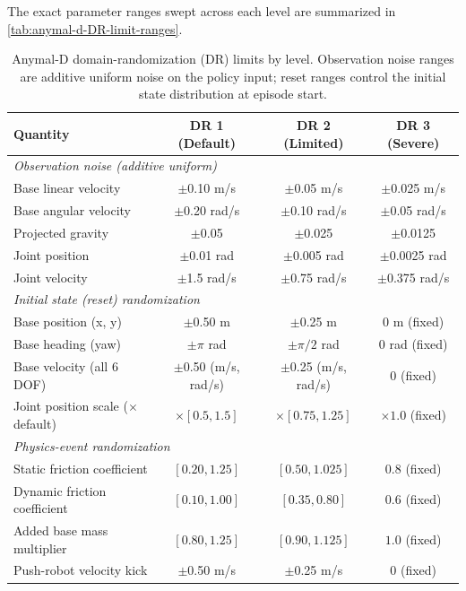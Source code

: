 \documentclass{article} %
\begin{document}
        The exact parameter ranges swept across each level are summarized in \autoref{tab:anymal-d-DR-limit-ranges}.
    
        \begin{table}[ht]
        \centering
        \caption{Anymal-D domain-randomization (DR) limits by level. Observation noise ranges are additive uniform noise on the policy input; reset ranges control the initial state distribution at episode start.}
        \label{tab:anymal-d-DR-limit-ranges}
        \begin{tabular}{lccc}
        \toprule
        Quantity & DR 1 (Default) & DR 2 (Limited) & DR 3 (Severe) \\
        \midrule
        \multicolumn{4}{l}{\textit{Observation noise (additive uniform)}} \\
        Base linear velocity & $\pm$0.10 m/s & $\pm$0.05 m/s & $\pm$0.025 m/s \\
        Base angular velocity & $\pm$0.20 rad/s & $\pm$0.10 rad/s & $\pm$0.05 rad/s \\
        Projected gravity & $\pm$0.05 & $\pm$0.025 & $\pm$0.0125 \\
        Joint position & $\pm$0.01 rad & $\pm$0.005 rad & $\pm$0.0025 rad \\
        Joint velocity & $\pm$1.5 rad/s & $\pm$0.75 rad/s & $\pm$0.375 rad/s \\
        \midrule
        \multicolumn{4}{l}{\textit{Initial state (reset) randomization}} \\
        Base position (x, y) & $\pm$0.50 m & $\pm$0.25 m & 0 m (fixed) \\
        Base heading (yaw) & $\pm\pi$ rad & $\pm\pi/2$ rad & 0 rad (fixed) \\
        Base velocity (all 6 DOF) & $\pm$0.50 (m/s, rad/s) & $\pm$0.25 (m/s, rad/s) & 0 (fixed) \\
        Joint position scale ($\times$ default) & $\times[0.5, 1.5]$ & $\times[0.75, 1.25]$ & $\times1.0$ (fixed) \\
        \midrule
        \multicolumn{4}{l}{\textit{Physics-event randomization}} \\
        Static friction coefficient & $[0.20, 1.25]$ & $[0.50, 1.025]$ & $0.8$ (fixed) \\
        Dynamic friction coefficient & $[0.10, 1.00]$ & $[0.35, 0.80]$ & $0.6$ (fixed) \\
        Added base mass multiplier & $[0.80, 1.25]$ & $[0.90, 1.125]$ & $1.0$ (fixed) \\
        Push-robot velocity kick & $\pm$0.50 m/s & $\pm$0.25 m/s & 0 (fixed) \\
        \bottomrule
        \end{tabular}
        \end{table}
\end{document}

